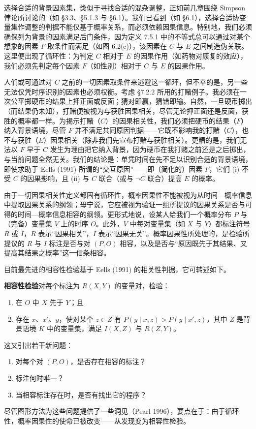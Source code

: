 选择合适的背景因素集，类似于寻找合适的混杂调整，正如前几章围绕 Simpson 悖论所讨论的（如 \S 3.3、\S 5.1.3 与 \S 6.1）。我们已看到（如 \S 6.1），选择合适协变量集作调整的判据不能仅基于概率关系，而必须依赖因果信息。特别地，我们必须确保列为背景的因素满足后门条件，因为定义 7.5.1 中的不等式总可以通过对某个想象的因素 $F$ 取条件而满足（如图 6.2(c)），该因素在 $C$ 与 $E$ 之间制造伪关联。这里便出现了循环性：为判定 $C$ 相对于 $E$ 的因果作用（如药物对康复的效应），我们必须先判定每个因素 $F$（如性别）相对于 $C$ 与 $E$ 的因果作用。

人们或可通过对 $C$ 之前的一切因素取条件来逃避这一循环，但不幸的是，另一些无法仅凭时序识别的因素也必须权衡。考虑 \S 7.2.2 所用的打赌例子。我必须在一次公平掷硬币的结果上押正面或反面；猜对即赢，猜错即输。自然，一旦硬币掷出（而结果仍未知），打赌便被视为与获胜因果相关，尽管无论押正面还是反面，获胜的概率都一样。为揭示打赌（$C$）的因果相关性，我们必须把硬币的结果（$F$）纳入背景语境，尽管 $F$ 并不满足共同原因判据——它既不影响我的打赌（$C$），也不与获胜（$E$）因果相关（除非我们先宣布打赌与获胜相关）。更糟的是，我们无法以 $F$ 早于 $C$ 发生为理由把它纳入背景，因为硬币在我打赌之前还是之后掷出，与当前问题全然无关。我们的结论是：单凭时间在先不足以识别合适的背景语境，即使求助于 Eells (1991) 所谓的“交互原因”——即（简化的）因素 $F$，它们 (i) 不受 $C$ 的因果影响，且 (ii) 与 $C$ 联合（或与 $\neg C$ 联合）提高 $E$ 的概率。

由于一切因果相关性定义都固有循环性，概率因果性不能被视为从时间—概率信息中提取因果关系的纲领；毋宁说，它应被视为验证一组所提议的因果关系是否与可得的时间—概率信息相容的纲领。更形式地说，设某人给我们一个概率分布 $P$ 与（完备）变量集 $V$ 上的时序 $O$。此外，$V$ 中每对变量集（如 $X$ 与 $Y$）都标注符号 $R$ 或 $I$，$R$ 表示“因果相关”，$I$ 表示“因果无关”。概率因果性所处理的，是检验所提议的 $R$ 与 $I$ 标注是否与对 $(P,O)$ 相容，以及是否与“原因既先于其结果、又提高其结果之概率”这一信条相容。

目前最先进的相容性检验基于 Eells (1991) 的相关性判据，它可转述如下。

\medskip
\noindent\textbf{相容性检验}\quad 对每个标注为 $R(X,Y)$ 的变量对，检验：
\begin{enumerate}[label=(\roman*),leftmargin=2.6em]
\item 在 $O$ 中 $X$ 先于 $Y$；且
\item 存在 $x$、$x'$、$y$，使对某个 $z\in Z$ 有 $P(y\mid x,z)>P(y\mid x',z)$，其中 $Z$ 是背景语境 $K$ 中的变量集，满足 $I(X,Z)$ 与 $R(Z,Y)$。
\end{enumerate}

这又引出若干新问题：
\begin{enumerate}[label=(\alph*),leftmargin=2.2em]
\item 对每个对 $(P,O)$，是否存在相容的标注？
\item 标注何时唯一？
\item 当相容标注存在时，是否有找出它的程序？
\end{enumerate}
尽管图形方法为这些问题提供了一些洞见（Pearl 1996），要点在于：由于循环性，概率因果性的使命已被改变——从发现变为相容性检验。

